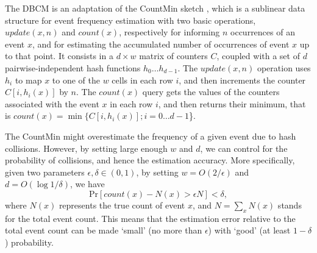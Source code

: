 \documentclass[a4paper,12pt]{article}
\newcommand{\prob}{\ensuremath{\mathrm{Pr}}}
\newcommand{\cm}{CountMin\xspace}
\newcommand{\strsetname}[1]{\ensuremath{\mathcal{\uppercase{#1}}}}
\begin{document}
The DBCM is an adaptation of the \cm sketch \cite{Cormode2005}, which is a sublinear data structure for event frequency estimation
with two basic operations, $update(x, n)$ and $count(x)$, respectively for informing $n$ occurrences of an event $x$, and for estimating the accumulated number of occurrences of event $x$ up to that point.
It consists in a $d\times w$ matrix of counters $C$, coupled with a set of $d$ pairwise-independent hash functions $h_0\ldots h_{d-1}$. The $update(x,n)$ operation uses $h_i$ to map $x$ to one of the $w$ cells in each row $i$, and then increments the counter $C[i,h_i(x)]$ by $n$. 
The $count(x)$ query gets the values of the counters associated with the event $x$ in each row $i$,  and then returns their minimum, that is $count(x)=\min\{C[i,h_i(x)]; i=0\ldots d-1$\}.


The \cm might overestimate the frequency of a given event due to hash collisions. However, by setting large enough $w$ and $d$, we can control for the probability of collisions, and hence the estimation accuracy. More specifically, given two parameters $\epsilon, \delta \in (0,1)$, by setting 
$w=O(2/\epsilon)$ and $d=O(\log1/\delta)$, we have
\begin{equation}
\label{eq:cm-prob}
\prob[count(x) - N(x) > \epsilon N] < \delta,
\end{equation}
where $N(x)$ represents the true count of event $x$,
and $N=\sum_x N(x)$ stands for the total event count. This means that the estimation error relative to the total event count can be made `small' (no more than $\epsilon$) with `good' (at least $1-\delta$) probability.
\end{document}
